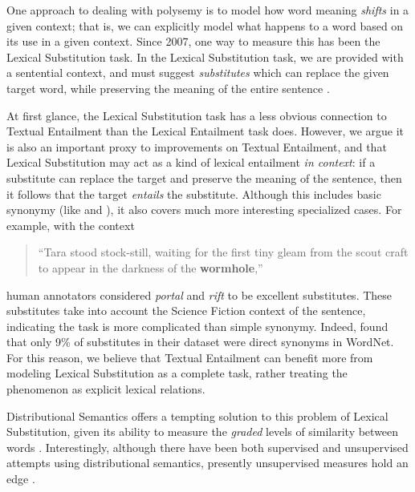 One approach to dealing with polysemy is to model how word
meaning {\em shifts} in a given context; that is, we can explicitly model what
happens to a word based on its use in a given context. Since 2007, one
way to measure this has been the Lexical Substitution task. In the
Lexical Substitution task, we are provided with a sentential context,
and must suggest {\em substitutes} which can replace the given target word,
while preserving the meaning of the entire sentence
\cite{mccarthy:2007:semeval,biemann:2012:lrec,kremer:2014:eacl}.

At first glance, the Lexical Substitution task has a less obvious connection to
Textual Entailment than the Lexical Entailment task does. However, we argue
it is also an important proxy to improvements on Textual Entailment, and that
Lexical Substitution may act as a kind of lexical entailment {\em
in context}: if a substitute can replace the target and preserve the meaning of
the sentence, then it follows that the target {\em entails} the substitute.
Although this includes basic synonymy (like  and ), it
also covers much more interesting specialized cases. For example, with the
context
\begin{quote}
  ``Tara stood stock-still, waiting for the first tiny gleam from the
  scout craft to appear in the darkness of the {\bf wormhole},''
\end{quote}
human annotators considered {\em portal} and {\em rift} to be excellent
substitutes. These substitutes take into account the Science Fiction context of the
sentence, indicating the task is more complicated than simple synonymy. Indeed,
 found that only 9\% of substitutes in their dataset were
direct synonyms in WordNet.  For this reason, we believe that Textual
Entailment can benefit more from modeling Lexical Substitution as a complete
task, rather treating the phenomenon as explicit lexical relations.

Distributional Semantics offers a tempting solution to this problem of Lexical
Substitution, given its ability to measure the {\em graded} levels of similarity
between words \cite{erk:2008:emnlp}. Interestingly, although there have been
both supervised \cite{biemann:2012:lrec,szarvas:2013:naacl} and unsupervised
attempts
\cite{erk:2008:emnlp,dinu:2010:emnlp,thater:2010:acl,vandecruys:2011:emnlp,kremer:2014:eacl,melamud:2015:naacl,melamud:2015:vsm,kawakami:2016:iclr,roller:2016:naacl}
using distributional semantics, presently unsupervised measures hold
an edge \cite{melamud:2015:naacl,melamud:2016:conll}.

